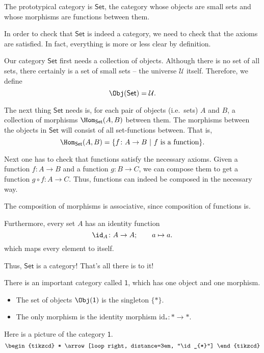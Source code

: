 \documentclass[notes.tex]{subfiles}
\begin{document}
\begin{example}
  The prototypical category is $\mathsf{Set}$, the category whose objects are small sets and whose morphisms are functions between them.

  In order to check that $\mathsf{Set}$ is indeed a category, we need to check that the axioms are satisfied. In fact, everything is more or less clear by definition.

  Our category $\mathsf{Set}$ first needs a collection of objects. Although there is no set of all sets, there certainly is a set of small sets -- the universe $\mathcal{U}$ itself. Therefore, we define
  \begin{equation*}
    \Obj(\mathsf{Set}) = \mathcal{U}.
  \end{equation*}

  The next thing $\mathsf{Set}$ needs is, for each pair of objects (i.e.\ sets) $A$ and $B$, a collection of morphisms $\Hom_{\mathsf{Set}}(A, B)$ between them. The morphisms between the objects in $\mathsf{Set}$ will consist of all set-functions between. That is,
  \begin{equation*}
    \Hom_{\mathsf{Set}}(A, B) = \{f\colon A \to B\ |\ f\ \text{is a function}\}.
  \end{equation*}

  Next one has to check that functions satisfy the necessary axioms. Given a function $f\colon A \to B$ and a function $g\colon B \to C$, we can compose them to get a function $g \circ f\colon A \to C$. Thus, functions can indeed be composed in the necessary way.

  The composition of morphisms is associative, since composition of functions is.

  Furthermore, every set $A$ has an identity function
  \begin{equation*}
    \id_{A}\colon A \to A;\qquad a \mapsto a.
  \end{equation*}
  which maps every element to itself.

  Thus, $\mathsf{Set}$ is a category! That's all there is to it!
\end{example}

\begin{example}
  \label{eg:categorywithoneobject}
  There is an important category called $\mathsf{1}$, which has one object and one morphism.
  \begin{itemize}
    \item The set of objects $\Obj(\mathsf{1})$ is the singleton $\{*\}$.

    \item The only morphism is the identity morphism $\mathrm{id}_{*}\colon * \to *$.
  \end{itemize}

  Here is a picture of the category $\mathsf{1}$.
  \begin{equation*}
    \begin{tikzcd}
      *
      \arrow[loop right, distance=3em, "\id_{*}"]
    \end{tikzcd}
  \end{equation*}
\end{example}
\end{document}
